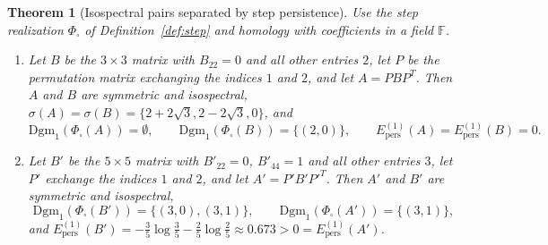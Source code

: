 \documentclass[11pt,a4paper,reqno]{amsart}
\newtheorem{theorem}{Theorem}[section]
\theoremstyle{definition}
\numberwithin{equation}{section}
\begin{document}
\begin{theorem}[Isospectral pairs separated by step persistence]
\label{thm:isospectral_separation}
Use the step realization $\Phi_\square$ of Definition~\ref{def:step} and homology with coefficients in a field $\mathbb{F}$.
\begin{enumerate}[label=(\alph*)]
    \item Let $B$ be the $3 \times 3$ matrix with $B_{22} = 0$ and all other entries $2$, let $P$ be the permutation matrix exchanging the indices $1$ and $2$, and let $A = PBP^T$. Then $A$ and $B$ are symmetric and isospectral, $\sigma(A) = \sigma(B) = \{2 + 2\sqrt{3}, 2 - 2\sqrt{3}, 0\}$, and
    \begin{equation}
        \mathrm{Dgm}_1(\Phi_\square(A)) = \emptyset, \qquad \mathrm{Dgm}_1(\Phi_\square(B)) = \{(2,0)\}, \qquad E^{(1)}_{\mathrm{pers}}(A) = E^{(1)}_{\mathrm{pers}}(B) = 0.
    \end{equation}
    \item Let $B'$ be the $5 \times 5$ matrix with $B'_{22} = 0$, $B'_{44} = 1$ and all other entries $3$, let $P'$ exchange the indices $1$ and $2$, and let $A' = P'B'P'^T$. Then $A'$ and $B'$ are symmetric and isospectral,
    \begin{equation}
        \mathrm{Dgm}_1(\Phi_\square(B')) = \{(3,0), (3,1)\}, \qquad \mathrm{Dgm}_1(\Phi_\square(A')) = \{(3,1)\},
    \end{equation}
    and $E^{(1)}_{\mathrm{pers}}(B') = -\frac{3}{5}\log\frac{3}{5} - \frac{2}{5}\log\frac{2}{5} \approx 0.673 > 0 = E^{(1)}_{\mathrm{pers}}(A')$.
\end{enumerate}
\end{theorem}
\end{document}
